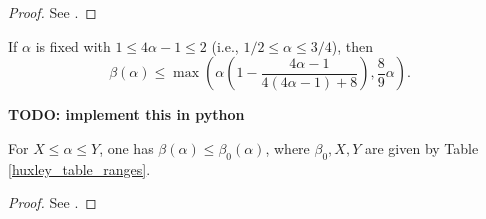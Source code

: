 \literature
{}

\begin{proof}
See \cite[Equation~(3.18)]{bourgain_decoupling_2017}.
\end{proof}

\begin{theorem}\label{beta-hb-2020}\cite[Theorem 11.2]{demeter_small_2020}  If $\alpha$ is fixed with $1 \leq 4\alpha-1 \leq 2$ (i.e., $1/2 \leq \alpha \leq 3/4$), then
$$ \beta(\alpha) \leq \max\left( \alpha\left(1 - \frac{4\alpha-1}{4(4\alpha-1)+8}\right), \frac{8}{9} \alpha\right).$$
\end{theorem}

{\bf TODO: implement this in python}

\begin{theorem}\label{combined-bound}  For $X \leq \alpha \leq Y$, one has $\beta(\alpha) \leq \beta_0(\alpha)$, where $\beta_0, X, Y$ are given by Table \ref{huxley_table_ranges}.
\end{theorem}

\begin{proof} See \cite[Table 3]{trudgian-yang}.
\end{proof}

